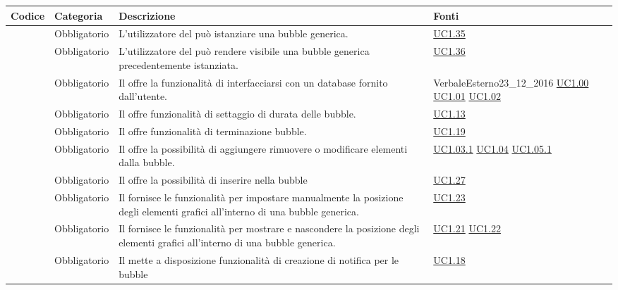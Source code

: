 \begin{longtable}{|P{1.5cm}|P{3cm}|P{6cm}|P{2.5cm}|}
	\hline \textbf{Codice} & \textbf{Categoria} & \textbf{Descrizione} & \textbf{Fonti} \\
	\hline \RequisitoObF\label{L6} & Obbligatorio & L’utilizzatore del  può istanziare una bubble generica. & \hyperref[UC1.35]{UC1.35} \\
	\hline \RequisitoObF\label{L7} & Obbligatorio & L’utilizzatore del  può rendere visibile una bubble generica precedentemente istanziata. & \hyperref[UC1.36]{UC1.36} \\
	\hline \RequisitoObF\label{L8} & Obbligatorio & Il  offre la funzionalità di interfacciarsi con un database  fornito dall’utente. & VerbaleEsterno23\_12\_2016 \linebreak \hyperref[UC1.00]{UC1.00} \linebreak \hyperref[UC1.01]{UC1.01} \hyperref[UC1.02]{UC1.02} \\
	\hline \RequisitoObF\label{L9} & Obbligatorio & Il  offre funzionalità di settaggio di durata delle bubble. & \hyperref[UC1.13]{UC1.13} \\
	\hline \RequisitoObF\label{L10} & Obbligatorio & Il  offre funzionalità di terminazione bubble. & \hyperref[UC1.19]{UC1.19} \\
	\hline \RequisitoObF\label{L11} & Obbligatorio & Il  offre la possibilità di aggiungere rimuovere o modificare elementi dalla bubble. & \hyperref[UC1.03.1]{UC1.03.1} \hyperref[UC1.04]{UC1.04} \hyperref[UC1.05.1]{UC1.05.1} \\
	\hline \RequisitoObF\label{L12} & Obbligatorio & Il  offre la possibilità di inserire  nella bubble & \hyperref[UC1.27]{UC1.27} \\
	\hline \RequisitoObF\label{L13} & Obbligatorio & Il  fornisce le funzionalità per impostare manualmente la posizione degli elementi grafici all'interno di una bubble generica. & \hyperref[UC1.23]{UC1.23} \\
	\hline \RequisitoObF\label{L14} & Obbligatorio & Il  fornisce le funzionalità per mostrare e nascondere la posizione degli elementi grafici all'interno di una bubble generica. & \hyperref[UC1.21]{UC1.21} \linebreak \hyperref[UC1.22]{UC1.22} \\
	\hline \RequisitoObF\label{L15} & Obbligatorio & Il  mette a disposizione funzionalità di creazione di notifica per le bubble & \hyperref[UC1.18]{UC1.18} \\

\end{longtable}
